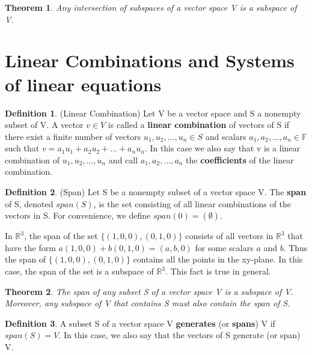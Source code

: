 \documentclass[12pt]{article}
\newtheorem{theorem}{Theorem}[section]
\theoremstyle{definition}
\newtheorem{definition}{Definition}[section]
\theoremstyle{remark}
\begin{document}
    \begin{theorem}
        Any intersection of subspaces of a vector space V is a subspace of V.
    \end{theorem}
\section{Linear Combinations and Systems of linear equations}
    \begin{definition}(Linear Combination)
        Let V be a vector space and S a nonempty subset of V. A vector $v \in V$ is called a 
        \textbf{linear combination} of vectors of S if there exist a finite number of vectors $u_1, u_2,..., u_n
        \in S$ and scalars $a_1, a_2 ,..., a_n \in \mathbb{F}$ such that $v = a_1u_1 + a_2u_2 +...+ a_nu_n$.
        In this case we also say that v is a linear combination of $u_1, u_2,..., u_n$ and call $a_1, a_2,..., a_n$ the \textbf{coefficients}
        of the linear combination.
    \end{definition}

    \begin{definition}(Span)
        Let S be a nonempty subset of a vector space V. The \textbf{span} of S, denoted $span(S)$, 
        is the set consisting of all linear combinations of the vectors in S. 
        For convenience, we define $span(0)={(\emptyset)}$.

    \end{definition}
    \begin{example}
        In $\mathbb{R}^3$, the span of the set $\{(1,0,0), (0,1, 0)\}$ consists of all vectors in 
        $\mathbb{R}^3$ that have the form $a(1,0,0)+b(0,1,0) = (a,b,0)$ for some
        scalars $a$ and $b$. Thus the span of $\{(1,0,0), (0, 1,0)\}$ contains all the points in 
        the xy-plane. In this case, the span of the set is a subspace of $\mathbb{R}^3$. This fact is true in general.
    \end{example}
    \begin{theorem}
        The span of any subset S of a vector space V is a subspace of V. Moreover, any subspace 
        of V that contains S must also contain the span of S.
    \end{theorem}

    \begin{definition}
        A subset S of a vector space V \textbf{generates} (or \textbf{spans}) V if $span(S) = V$. In this case, 
        we also say that the vectors of S generate (or span) V.
    \end{definition}
\end{document}
